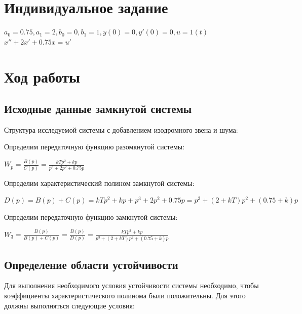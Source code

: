 \documentclass[14pt,a4paper,report]{report}
\begin{document}
	\section{Индивидуальное задание}
	
	$a_0=0.75,a_1=2,b_0=0,b_1=1,  y(0)=0, y'(0)=0, u=1(t)$
	\\
	$
	x''+2x'+0.75x=u'
	$
	
	
	\section{Ход работы}
	
	\subsection{Исходные данные замкнутой системы}
	
	Структура исследуемой системы с добавлением изодромного звена и шума:
	
	
	\clearpage
	
	Определим передаточную функцию разомкнутой системы:
	
	\begin{center}
		$W_p=\frac{B(p)}{C(p)}=\frac{kTp^2+kp}{p^3+2p^2+0.75p}$
	\end{center}
	
	Определим характеристический полином замкнутой системы:
	
	\begin{center}
		$D(p)=B(p)+C(p)=kTp^2+kp+p^3+2p^2+0.75p=p^3+(2+kT)p^2+(0.75+k)p$
	\end{center}
	
	Определим передаточную функцию замкнутой системы:
	
	\begin{center}
		$W_3=\frac{B(p)}{B(p)+C(p)}=\frac{B(p)}{D(p)}=\frac{kTp^2+kp}{p^3+(2+kT)p^2+(0.75+k)p}$
	\end{center}
	
	\subsection{Определение области устойчивости}
	
	Для выполнения необходимого условия устойчивости системы необходимо, чтобы коэффициенты характеристического полинома были положительны. Для этого должны выполняться следующие условия:
	
\end{document}
